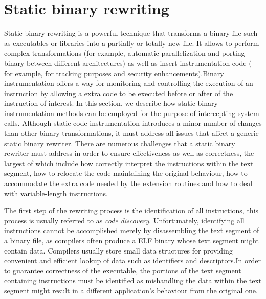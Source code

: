  
\section{Static binary rewriting}
\label{static_rewriting}

Static binary rewriting  is a powerful technique that transforms a binary file such as executables or libraries into a partially or totally new file. It allows to perform complex transformations (for example, automatic parallelization and porting binary between different architectures) as well as insert instrumentation code ( for example, for tracking purposes and security enhancements).Binary instrumentation offers a way for monitoring and controlling the execution of an instruction by allowing a extra code to be executed before or after of the instruction of interest. In this section, we describe how static binary instrumentation methods can be employed for the purpose of intercepting system calls. 
Although static code instrumentation introduces a minor number of changes than other  binary transformations, it must address all issues that affect a generic static binary rewriter. There are numerous challenges that a static binary rewriter must address in order to ensure effectiveness as well as correctness, the largest of which include how correctly interpret the instructions within the text segment, how to relocate the code maintaining the original behaviour,  how to accommodate the extra code needed by the extension routines and how to deal with variable-length instructions. 

The first step of the rewriting process is the identification of all instructions, this process is usually referred to as \emph{code discovery}. Unfortunately, identifying all instructions cannot be accomplished merely by disassembling the text segment of a binary file, as compilers often produce a ELF binary whose text segment might contain data. Compilers usually store small data structures for providing convenient and efficient lookup of data such as identifiers and descriptors.In order to guarantee correctness of the executable, the portions of the text segment containing instructions must be identified as mishandling the data within the text segment might result in a different application's behaviour from the original one.

